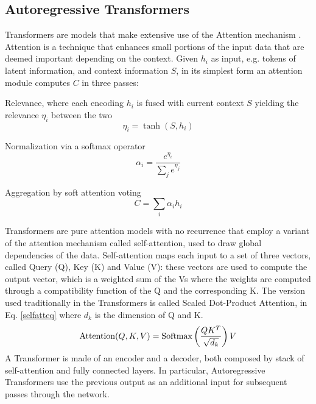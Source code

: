 \documentclass[conference]{IEEEtran}
\begin{document}
\subsection{Autoregressive Transformers}
Transformers \cite{transformer} are models that make extensive use of the Attention mechanism \cite{attention}. Attention is a technique that enhances small portions of the input data that are deemed important depending on the context. Given $h_i$ as input, e.g. tokens of latent information, and context information $S$, in its simplest form an attention module computes $C$ in three passes:
\begin{list}{-}{}
	\item Relevance, where each encoding $h_i$ is fused with current context $S$ yielding the relevance $\eta_i$ between the two
	\begin{equation}
	\eta_i = \tanh(S, h_i)
	\label{attentionrelevance}
	\end{equation}
	\item Normalization via a softmax operator
	\begin{equation}
	\alpha_i = \frac{e^{\eta_i}}{\sum_j e^{\eta_j}}
	\label{attentionnormalization}
	\end{equation}
	\item Aggregation by soft attention voting
	\begin{equation}
	C = \sum_i\alpha_ih_i
	\label{attentionaggregation}
	\end{equation}
\end{list}
Transformers are pure attention models with no recurrence that employ a variant of the attention mechanism called self-attention, used to draw global dependencies of the data. Self-attention maps each input to a set of three vectors, called Query (Q), Key (K) and Value (V): these vectors are used to compute the output vector, which is a weighted sum of the Vs where the weights are computed through a compatibility function of the Q and the corresponding K. The version used traditionally in the Transformers is called Scaled Dot-Product Attention, in Eq. \ref{selfatteq} where $d_k$ is the dimension of Q and K.
\begin{equation}
\hbox{Attention}(Q, K, V) = \hbox{Softmax}\left(\frac{QK^T}{\sqrt{d_k}}\right)V
\label{selfatteq}
\end{equation}
A Transformer is made of an encoder and a decoder, both composed by stack of self-attention and fully connected layers. In particular, Autoregressive Transformers use the previous output as an additional input for subsequent passes through the network.\\
\end{document}
